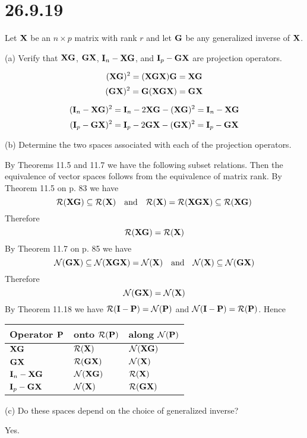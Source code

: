 \section*{26.9.19}
Let $\bf X$ be an $n\times p$ matrix with rank $r$ and let $\bf G$
be any generalized inverse of $\bf X$.

\bigskip
\noindent
(a) Verify that $\bf XG$, $\bf GX$, ${\bf I}_n-\bf XG$, and
${\bf I}_p-\bf GX$ are projection operators.

$$({\bf XG})^2=({\bf XGX}){\bf G}={\bf XG}$$
$$({\bf GX})^2={\bf G}({\bf XGX})={\bf GX}$$

$$({\bf I}_n-{\bf XG})^2={\bf I}_n-2{\bf XG}-({\bf XG})^2
={\bf I}_n-{\bf XG}$$
$$({\bf I}_p-{\bf GX})^2={\bf I}_p-2{\bf GX}-({\bf GX})^2
={\bf I}_p-{\bf GX}$$

\bigskip
\noindent
(b) Determine the two spaces associated with each of the
projection operators.

\bigskip
\noindent
By Theorems 11.5 and 11.7 we have the following subset relations.
Then the equivalence of vector spaces follows from the equivalence
of matrix rank.
%
%
By Theorem 11.5 on p. 83 we have
$${\cal R}({\bf XG})\subseteq{\cal R}({\bf X})\quad\hbox{and}\quad
{\cal R}({\bf X})={\cal R}({\bf XGX})\subseteq{\cal R}({\bf XG})$$
Therefore
$${\cal R}({\bf XG})={\cal R}({\bf X})$$
%
By Theorem 11.7 on p. 85 we have
$${\cal N}({\bf GX})\subseteq{\cal N}({\bf XGX})={\cal N}({\bf X})
\quad\hbox{and}\quad
{\cal N}({\bf X})\subseteq{\cal N}({\bf GX})$$
Therefore
$${\cal N}({\bf GX})={\cal N}({\bf X})$$
By Theorem 11.18 we have 
${\cal R}({\bf I}-{\bf P})={\cal N}({\bf P})$
and
${\cal N}({\bf I}-{\bf P})={\cal R}({\bf P})$.
Hence

\begin{center}
\begin{tabular}{|l|l|l|}
\hline
Operator $\bf P$ & onto ${\cal R}({\bf P})$ & along ${\cal N}({\bf P})$\\
\hline
${\bf XG}$ & ${\cal R}({\bf X})$ & ${\cal N}({\bf XG})$\\
${\bf GX}$ & ${\cal R}({\bf GX})$ & ${\cal N}({\bf X})$\\
${\bf I}_n-\bf XG$ & ${\cal N}({\bf XG})$ & ${\cal R}({\bf X})$\\
${\bf I}_p-\bf GX$ & ${\cal N}({\bf X})$ & ${\cal R}({\bf GX})$\\
\hline
\end{tabular}
\end{center}

\bigskip
\noindent
(c) Do these spaces depend on the choice of generalized inverse?

\bigskip
\noindent
Yes.

